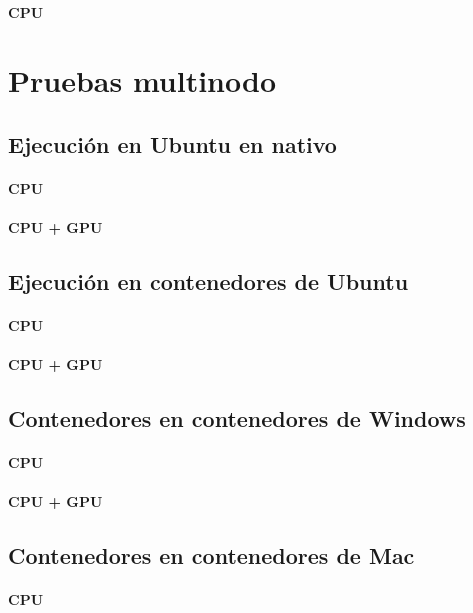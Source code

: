 \paragraph{CPU}

\section{Pruebas multinodo}
\subsection{Ejecución en Ubuntu en nativo}
\paragraph{CPU}

\paragraph{CPU + GPU}

\subsection{Ejecución en contenedores de Ubuntu}
\paragraph{CPU}

\paragraph{CPU + GPU}

\subsection{Contenedores en contenedores de Windows}
\paragraph{CPU}

\paragraph{CPU + GPU}

\subsection{Contenedores en contenedores de Mac}
\paragraph{CPU}

